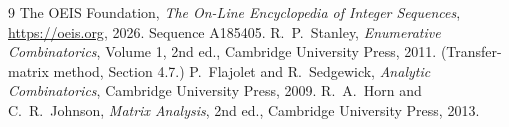 \documentclass[11pt,a4paper]{article}
\theoremstyle{plain}
\theoremstyle{definition}
\begin{document}
\begin{thebibliography}{9}
 The OEIS Foundation, \emph{The On-Line Encyclopedia of Integer
Sequences}, \url{https://oeis.org}, 2026. Sequence A185405.
 R.~P.~Stanley, \emph{Enumerative Combinatorics}, Volume 1, 2nd ed.,
Cambridge University Press, 2011. (Transfer-matrix method, Section 4.7.)
 P.~Flajolet and R.~Sedgewick, \emph{Analytic Combinatorics}, Cambridge
University Press, 2009.
 R.~A.~Horn and C.~R.~Johnson, \emph{Matrix Analysis}, 2nd ed., Cambridge
University Press, 2013.
\end{thebibliography}
\end{document}
